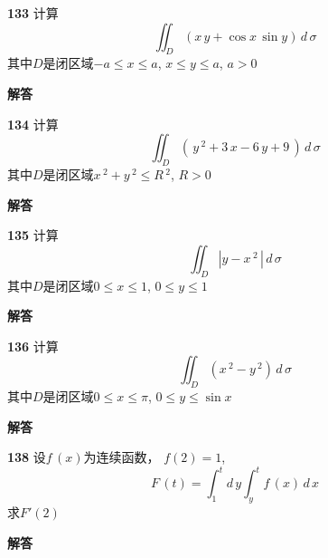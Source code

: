 \documentclass[a4paper,10pt]{article} %
\begin{document}
\par\noindent \textbf{133} \quad 计算
$$ \iint_D \left(x\,y+\cos x\,\sin y\right)\,d\,\sigma$$
其中$D$是闭区域$-a\leq x\leq a$, $x\leq y\leq a$, $a>0$
\par\noindent \textbf{ 解答}




\textheight


\par\noindent \textbf{134} \quad 计算
$$ \iint_D \left(\,y\,^2+3\,x-6\,y+9\,\right)\,d\,\sigma$$
其中$D$是闭区域$x\,^2+y\,^2\leq R\,^2$, $R>0$
\par\noindent \textbf{ 解答}




\textheight


\par\noindent \textbf{135} \quad 计算
$$ \iint_D \left|y-x\,^2\,\right|\,d\,\sigma$$
其中$D$是闭区域$0\leq x\leq 1$, $0\leq y\leq 1$
\par\noindent \textbf{ 解答}




\textheight


\par\noindent \textbf{136} \quad 计算
$$ \iint_D \left(x\,^2-y\,^2\right)\,d\,\sigma$$
其中$D$是闭区域$0\leq x\leq \pi$, $0\leq y\leq \sin x$
\par\noindent \textbf{ 解答}




\textheight


\par\noindent \textbf{138} \quad 设$f\,(x)$为连续函数， $f(2)=1$,
$$ F\,(t)=\int_1^td\,y\int_y^t f\,(x)\,d\,x$$
求$F'(2)$
\par\noindent \textbf{ 解答}



\end{document}
